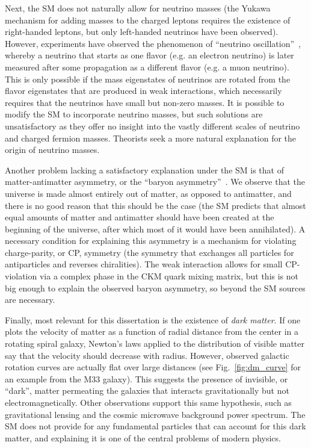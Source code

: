 Next, the SM does not naturally allow for neutrino masses (the Yukawa mechanism for adding masses to the charged leptons
requires the existence of right-handed leptons, but only left-handed neutrinos have been observed). However,
experiments have observed the phenomenon of ``neutrino oscillation''~\cite{PDGreview14}, whereby a neutrino that
starts as one flavor (e.g. an electron neutrino) is later measured after some propagation as a different flavor
(e.g. a muon neutrino). This is only possible if the mass eigenstates of neutrinos are rotated from the flavor
eigenstates that are produced in weak interactions, which necessarily requires that the neutrinos have small
but non-zero masses. It is possible to modify the SM to incorporate neutrino masses, but such solutions are
unsatisfactory as they offer no insight into the vastly different scales of neutrino and charged fermion masses.
Theorists seek a more natural explanation for the origin of neutrino masses.

Another problem lacking a satisfactory explanation under the SM is that of matter-antimatter asymmetry, 
or the ``baryon asymmetry''~\cite{Canetti:baryon_asymm}. 
We observe that the universe is made almost entirely out of matter, as opposed
to antimatter, and there is no good reason that this should be the case (the SM predicts that almost equal amounts
of matter and antimatter should have been created at the beginning of the universe, after which most of it
would have been annihilated). A necessary condition for explaining this asymmetry is a mechanism for violating
charge-parity, or CP, symmetry (the symmetry that exchanges all particles for antiparticles and reverses chiralities).
The weak interaction allows for small CP-violation via a complex phase in the CKM quark mixing matrix, but this
is not big enough to explain the observed baryon asymmetry, so beyond the SM sources are necessary.

Finally, most relevant for this dissertation is the existence of \textit{dark matter}. If one plots the velocity of
matter as a function of radial distance from the center in a rotating spiral galaxy, Newton's laws
applied to the distribution of visible matter say that the velocity should decrease with radius. However, observed 
galactic rotation curves are actually flat over large distances (see Fig.~\ref{fig:dm_curve} for an example from the M33
galaxy). This suggests the presence of invisible, or ``dark'', matter permeating the galaxies that interacts
gravitationally but not electromagnetically. Other observations support this same hypothesis, such as gravitational
lensing and the cosmic microwave background power spectrum. The SM does not provide for any fundamental particles
that can account for this dark matter, and explaining it is one of the central problems of modern physics.

